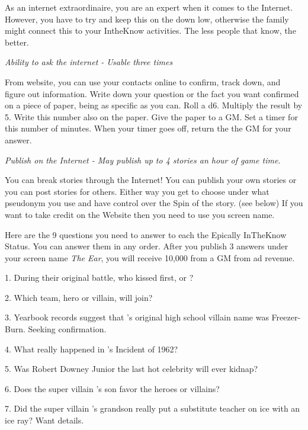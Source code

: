 \documentclass[green]{LRSguildcamp1}
\begin{document}
\name{\gInternetPR{}}

As an internet extraordinaire, you are an expert when it comes to the Internet. However, you have to try and keep this on the down low, otherwise the family might connect this to your IntheKnow activities. The less people that know, the better. 

\textit{Ability to ask the internet - Usable three times}

From \pTweenwebsite{} website, you can use your contacts online to confirm, track down, and figure out information. Write down your question or the fact you want confirmed on a piece of paper, being as specific as you can. Roll a d6. Multiply the result by 5. Write this number also on the paper. Give the paper to a GM. Set a timer for this number of minutes. When your timer goes off, return the the GM for your answer. 

\textit{Publish on the Internet - May publish up to 4 stories an hour of game time.}

You can break stories through the Internet! You can publish your own stories or you can post stories for others. Either way you get to choose under what pseudonym you use and have control over the Spin of the story. (see below) If you want to take credit on the \pTweenwebsite{} Website then you need to use you screen name.

Here are the 9 questions you need to answer to each the Epically InTheKnow Status. You can answer them in any order. After you publish 3 answers under your screen name \textit{The Ear}, you will receive 10,000 from a GM from ad revenue. 

1. During their original battle, who kissed first, \cOS{\MYsupername} or \cOldest{\MYsupername}?

2. Which team, hero or villain, will \cGrad{} join?

3. Yearbook records suggest that \cOldest{\MYsupername}'s original high school villain name was Freezer-Burn. Seeking confirmation. 

4. What really happened in \cGrandma{\MYsupername}'s Incident of 1962?

5. Was Robert Downey Junior the last hot celebrity  \cGrandma{\MYsupername} will ever kidnap?

6. Does the super villain \cGrandma{\MYsupername}'s son \cArchitect{} favor the heroes or villains?

7. Did the super villain \cGrandma{\MYsupername}'s grandson \cTeen{} really put a substitute teacher on ice with an ice ray? Want details. 
\end{document}
